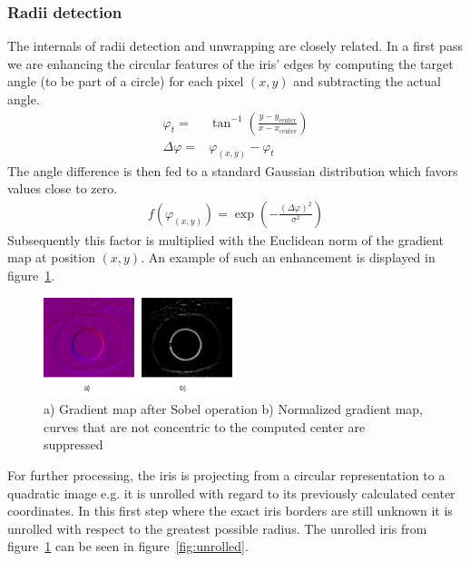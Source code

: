 \documentclass[journal]{IEEEtran}
\begin{document}
\subsubsection{Radii detection}
The internals of radii detection and unwrapping are closely related. In a first pass we are enhancing the circular features of the iris' edges by computing the target angle (to be part of a circle) for each pixel $(x,y)$ and subtracting the actual angle.
\begin{align*}
	\varphi_t =& \tan^{-1}\left(\frac{y - y_{\text{center}}}{x - x_{\text{center}}}\right) \\
	\Delta \varphi =& \varphi_{(x,y)} - \varphi_t
\end{align*}
The angle difference is then fed to a standard Gaussian distribution which favors values close to zero.
\begin{align*}
	f(\varphi_{(x,y)}) = \exp\left(-\frac{(\Delta \varphi)^2}{\sigma^2}\right)
\end{align*}
Subsequently this factor is multiplied with the Euclidean norm of the gradient map at position $(x,y)$. An example of such an enhancement is displayed in figure~\ref{fig:sobel_norm}.
\begin{figure}[ht]
	\centering
  \includegraphics[width=0.49\textwidth]{iris/sobel_norm.png}
	\caption{a) Gradient map after Sobel operation b) Normalized gradient map, curves that are not concentric to the computed center are suppressed}
	\label{fig:sobel_norm}
\end{figure}
For further processing, the iris is projecting from a circular representation to a quadratic image e.g. it is unrolled with regard to its previously calculated center coordinates. In this first step where the exact iris borders are still unknown it is unrolled with respect to the greatest possible radius. The unrolled iris from figure~\ref{fig:sobel_norm} can be seen in figure~\ref{fig:unrolled}. 
\end{document}
